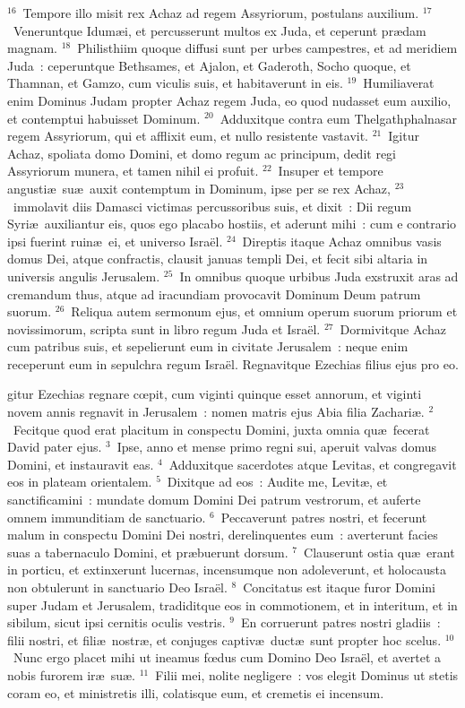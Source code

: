 ${}^{16}$~Tempore illo misit rex Achaz ad regem Assyriorum, postulans auxilium.
${}^{17}$~Veneruntque Idum\ae i, et percusserunt multos ex Juda, et ceperunt pr\ae dam magnam.
${}^{18}$~Philisthiim quoque diffusi sunt per urbes campestres, et ad meridiem Juda~: ceperuntque Bethsames, et Ajalon, et Gaderoth, Socho quoque, et Thamnan, et Gamzo, cum viculis suis, et habitaverunt in eis.
${}^{19}$~Humiliaverat enim Dominus Judam propter Achaz regem Juda, eo quod nudasset eum auxilio, et contemptui habuisset Dominum.
${}^{20}$~Adduxitque contra eum Thelgathphalnasar regem Assyriorum, qui et afflixit eum, et nullo resistente vastavit.
${}^{21}$~Igitur Achaz, spoliata domo Domini, et domo regum ac principum, dedit regi Assyriorum munera, et tamen nihil ei profuit.
${}^{22}$~Insuper et tempore angusti\ae\ su\ae\ auxit contemptum in Dominum, ipse per se rex Achaz,
${}^{23}$~immolavit diis Damasci victimas percussoribus suis, et dixit~: Dii regum Syri\ae\ auxiliantur eis, quos ego placabo hostiis, et aderunt mihi~: cum e contrario ipsi fuerint ruin\ae\ ei, et universo Isra\"el.
${}^{24}$~Direptis itaque Achaz omnibus vasis domus Dei, atque confractis, clausit januas templi Dei, et fecit sibi altaria in universis angulis Jerusalem.
${}^{25}$~In omnibus quoque urbibus Juda exstruxit aras ad cremandum thus, atque ad iracundiam provocavit Dominum Deum patrum suorum.
${}^{26}$~Reliqua autem sermonum ejus, et omnium operum suorum priorum et novissimorum, scripta sunt in libro regum Juda et Isra\"el.
${}^{27}$~Dormivitque Achaz cum patribus suis, et sepelierunt eum in civitate Jerusalem~: neque enim receperunt eum in sepulchra regum Isra\"el. Regnavitque Ezechias filius ejus pro eo.

\bchapter
{}gitur Ezechias regnare cœpit, cum viginti quinque esset annorum, et viginti novem annis regnavit in Jerusalem~: nomen matris ejus Abia filia Zachari\ae .
${}^{2}$~Fecitque quod erat placitum in conspectu Domini, juxta omnia qu\ae\ fecerat David pater ejus.
${}^{3}$~Ipse, anno et mense primo regni sui, aperuit valvas domus Domini, et instauravit eas.
${}^{4}$~Adduxitque sacerdotes atque Levitas, et congregavit eos in plateam orientalem.
${}^{5}$~Dixitque ad eos~: Audite me, Levit\ae , et sanctificamini~: mundate domum Domini Dei patrum vestrorum, et auferte omnem immunditiam de sanctuario.
${}^{6}$~Peccaverunt patres nostri, et fecerunt malum in conspectu Domini Dei nostri, derelinquentes eum~: averterunt facies suas a tabernaculo Domini, et pr\ae buerunt dorsum.
${}^{7}$~Clauserunt ostia qu\ae\ erant in porticu, et extinxerunt lucernas, incensumque non adoleverunt, et holocausta non obtulerunt in sanctuario Deo Isra\"el.
${}^{8}$~Concitatus est itaque furor Domini super Judam et Jerusalem, tradiditque eos in commotionem, et in interitum, et in sibilum, sicut ipsi cernitis oculis vestris.
${}^{9}$~En corruerunt patres nostri gladiis~: filii nostri, et fili\ae\ nostr\ae , et conjuges captiv\ae\ duct\ae\ sunt propter hoc scelus.
${}^{10}$~Nunc ergo placet mihi ut ineamus fœdus cum Domino Deo Isra\"el, et avertet a nobis furorem ir\ae\ su\ae .
${}^{11}$~Filii mei, nolite negligere~: vos elegit Dominus ut stetis coram eo, et ministretis illi, colatisque eum, et cremetis ei incensum.


